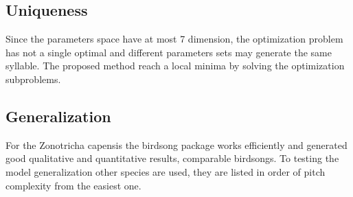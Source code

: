\subsection{Uniqueness}

Since the parameters space have at most 7 dimension, the optimization problem has not a single optimal and different parameters sets may generate the same syllable. The proposed method reach a local minima by solving the optimization subproblems. 


\subsection{Generalization}

For the Zonotricha capensis the birdsong package works efficiently and generated good qualitative and quantitative results, comparable birdsongs. To testing the model generalization other species are used, they are listed in order of pitch complexity from the easiest one.


